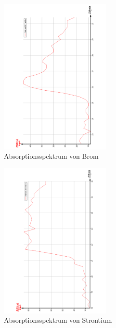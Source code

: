 \begin{figure}
  \centering
  \includegraphics[width=0.5\textwidth, angle=270]{bilder/AbsorpBr.pdf}
  \caption{Absorptionsspektrum von Brom}
  \label{fig:Brom}
\end{figure}
\begin{figure}
  \centering
  \includegraphics[width=0.5\textwidth, angle=270]{bilder/AbsorpSr.pdf}
  \caption{Absorptionsspektrum von Strontium}
  \label{fig:Strontium}
\end{figure}
